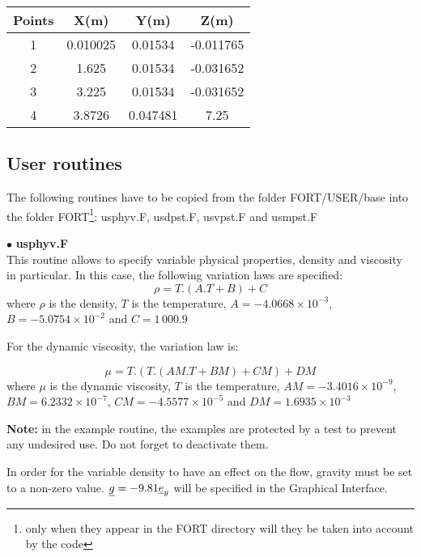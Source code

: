 \begin{center}
\begin{tabular}{|c|c|c|c|}
\hline
Points & X(m) & Y(m) & Z(m)\\
\hline
1 & 0.010025 & 0.01534 & -0.011765 \\
\hline
2 & 1.625 & 0.01534 & -0.031652 \\
\hline
3 & 3.225 & 0.01534 & -0.031652 \\
\hline
4 & 3.8726 & 0.047481 & 7.25 \\
\hline
\end{tabular}
\end{center}



        \subsection{User routines}

The following routines have to be copied from the folder FORT/USER/base into the
folder FORT\footnote{only when they appear in the FORT directory will they be
taken into account by the code}: usphyv.F, usdpst.F, usvpst.F and usmpst.F


$\bullet$ {\bfseries usphyv.F}\\
This routine allows to specify variable physical properties, density and
viscosity in particular. In this case, the following variation laws are specified:
\begin{equation}
\rho = T.(A.T + B) + C
\end{equation}
where $\rho$ is the density, $T$ is the temperature, $A = -4.0668\times10^{-3}$,
$B =-5.0754\times 10^{-2}$ and $C = 1\,000.9$


For the dynamic viscosity, the variation law is:

\begin{equation}
\mu = T.(T.(AM.T + BM) + CM) + DM
\end{equation}
where $\mu$ is the dynamic viscosity, $T$ is the temperature,
$AM=-3.4016\times 10^{-9}$, $BM = 6.2332\times 10^{-7}$,
$CM = -4.5577\times 10^{-5}$ and $DM = 1.6935\times 10^{-3}$


\textbf{Note:} in the example routine, the examples are protected by a test to prevent any
undesired use. Do not forget to deactivate them.

In order for the variable density to have an effect on the flow, gravity must be
set to a non-zero value. $\underline{g} = -9.81 \underline{e}_y$ will be specified in the
Graphical Interface.


